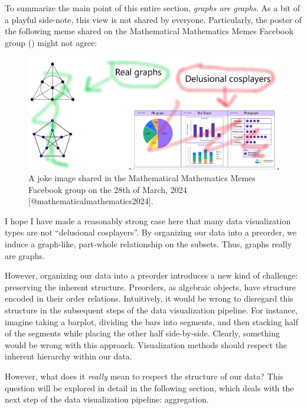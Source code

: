 \documentclass[
]{book}
\theoremstyle{definition}
\theoremstyle{definition}
\theoremstyle{definition}
\theoremstyle{definition}
\theoremstyle{remark}
\begin{document}
To summarize the main point of this entire section, \emph{graphs are graphs}. As a bit of a playful side-note, this view is not shared by everyone. Particularly, the poster of the following meme shared on the Mathematical Mathematics Memes Facebook group () might not agree:

\begin{figure}

{\centering \includegraphics[width=0.75\linewidth,height=1\textheight,style="border:1px solid black;"]{./figures/graphs-cosplayers} 

}

\caption{A joke image shared in the Mathematical Mathematics Memes Facebook group on the 28th of March, 2024 [@mathematicalmathematics2024].}\label{fig:meme}
\end{figure}

I hope I have made a reasonably strong case here that many data visualization types are not ``delusional cosplayers''. By organizing our data into a preorder, we induce a graph-like, part-whole relationship on the subsets. Thus, graphs really are graphs.

However, organizing our data into a preorder introduces a new kind of challenge: preserving the inherent structure. Preorders, as algebraic objects, have structure encoded in their order relations. Intuitively, it would be wrong to disregard this structure in the subsequent steps of the data visualization pipeline. For instance, imagine taking a barplot, dividing the bars into segments, and then stacking half of the segments while placing the other half side-by-side. Clearly, something would be wrong with this approach. Visualization methods should respect the inherent hierarchy within our data.

However, what does it \emph{really} mean to respect the structure of our data? This question will be explored in detail in the following section, which deals with the next step of the data visualization pipeline: aggregation.
\end{document}

